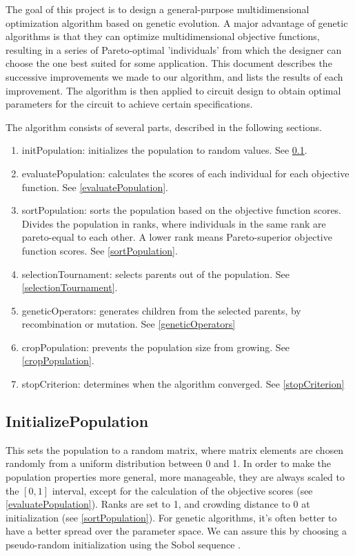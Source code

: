 
The goal of this project is to design a general-purpose multidimensional optimization algorithm based on genetic evolution. A major advantage of genetic algorithms is that they can optimize multidimensional objective functions, resulting in a series of Pareto-optimal 'individuals' from which the designer can choose the one best suited for some application. This document describes the successive improvements we made to our algorithm, and lists the results of each improvement. The algorithm is then applied to circuit design to obtain optimal parameters for the circuit to achieve certain specifications.


The algorithm consists of several parts, described in the following sections.
\begin{enumerate}
	  \setlength\itemsep{0em}
\item initPopulation: initializes the population to random values. See \cref{initPopulation}.
\item evaluatePopulation: calculates the scores of each individual for each objective function. See \cref{evaluatePopulation}.
\item sortPopulation: sorts the population based on the objective function scores. Divides the population in ranks, where individuals in the same rank are pareto-equal to each other. A lower rank means Pareto-superior objective function scores. See \cref{sortPopulation}.
\item selectionTournament: selects parents out of the population. See \cref{selectionTournament}.
\item geneticOperators: generates children from the selected parents, by recombination or mutation. See \cref{geneticOperators}
\item cropPopulation: prevents the population size from growing. See \cref{cropPopulation}.
\item stopCriterion: determines when the algorithm converged. See \cref{stopCriterion}
\end{enumerate}

\subsection{InitializePopulation} \label{initPopulation}
This sets the population to a random matrix, where matrix elements are chosen randomly from a uniform distribution between 0 and 1. In order to make the population properties more general, more manageable, they are always scaled to the $[0,1]$ interval, except for the calculation of the objective scores (see \ref{evaluatePopulation}).
Ranks are set to 1, and crowding distance to 0 at initialization (see \ref{sortPopulation}).
For genetic algorithms, it's often better to have a better spread over the parameter space. We can assure this by choosing a pseudo-random initialization using the Sobol sequence \cite{sobol1976uniformly}.

